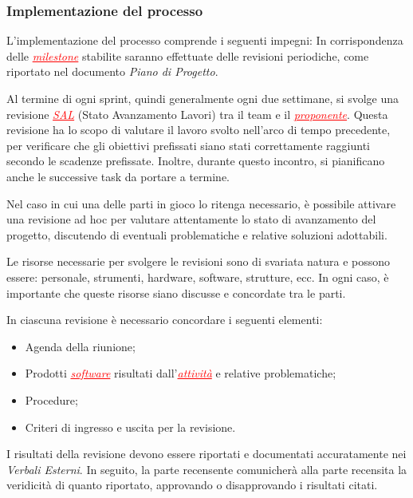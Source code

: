 \subsubsection{Implementazione del processo}
L'implementazione del processo comprende i seguenti impegni:
In corrispondenza delle \textcolor{red}{\uline{\textit{milestone}}} stabilite saranno effettuate delle revisioni periodiche, come riportato nel
documento \textit{Piano di Progetto}.

Al termine di ogni sprint, quindi generalmente ogni due settimane, si svolge una revisione \textcolor{red}{\uline{\textit{SAL}}}
(Stato Avanzamento Lavori) tra il team e il \textcolor{red}{\uline{\textit{proponente}}}. Questa revisione ha lo scopo di valutare il lavoro svolto
nell'arco di tempo precedente, per verificare che gli obiettivi prefissati siano stati correttamente raggiunti secondo le scadenze prefissate.
Inoltre, durante questo incontro, si pianificano anche le successive task da portare a termine.

Nel caso in cui una delle parti in gioco lo ritenga necessario, è possibile attivare una revisione ad hoc per valutare attentamente lo stato
di avanzamento del progetto, discutendo di eventuali problematiche e relative soluzioni adottabili.

Le risorse necessarie per svolgere le revisioni sono di svariata natura e possono essere: personale, strumenti, hardware, software, strutture, ecc.
In ogni caso, è importante che queste risorse siano discusse e concordate tra le parti.

In ciascuna revisione è necessario concordare i seguenti elementi:
\begin{itemize}
    \item Agenda della riunione;
    \item Prodotti \textcolor{red}{\uline{\textit{software}}} risultati dall'\textcolor{red}{\uline{\textit{attività}}} e relative problematiche;
    \item Procedure;
    \item Criteri di ingresso e uscita per la revisione.
\end{itemize}

I risultati della revisione devono essere riportati e documentati accuratamente nei \textit{Verbali Esterni}. In seguito, la parte recensente
comunicherà alla parte recensita la veridicità di quanto riportato, approvando o disapprovando i risultati citati.

